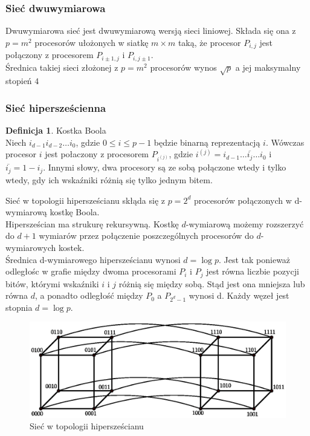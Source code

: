 \documentclass[a4paper,oneside,leqno,12pt]{book}
\theoremstyle{definition}
\newtheorem{definicja}{Definicja}[chapter]
\theoremstyle{plain}
\theoremstyle{remark}
\begin{document}
\subsubsection{Sieć dwuwymiarowa}

Dwuwymiarowa sieć jest dwuwymiarową wersją sieci liniowej. Składa się ona z \(p=m^2\) procesorów ułożonych w siatkę \(m\times m\) taką, że procesor \(P_{i,j}\) jest połączony z procesorem \(P_{i\pm 1, j}\) i \(P_{i, j\pm 1}\).\\
Średnica takiej sieci złożonej z \(p=m^2\) procesorów wynos \(\sqrt{p}\) a jej maksymalny stopień \(4\)


\subsubsection{Sieć hipersześcienna}

\begin{definicja}{Kostka Boola}\\
Niech \(i_{d-1}i_{d-2}\dots i_{0}\), gdzie \(0\leq i \leq p-1\) będzie binarną reprezentacją \(i\). Wówczas procesor \({i}\) jest połaczony z procesorem \(P_{i^(j)}\), gdzie \(i^{(j)}=i_{d-1}\dots \overline{i_j} \dots i_0\) i \(\overline{i_j} = 1 - i_j\). Innymi słowy, dwa procesory są ze sobą połączone wtedy i tylko wtedy, gdy ich wskaźniki różnią się tylko jednym bitem.\\
\end{definicja}

Sieć w topologii hipersześcianu skłąda się z \(p=2^d\) procesorów połączonych w d-wymiarową kostkę Boola.\\

Hipersześcian ma strukurę rekursywną. Kostkę \(d\)-wymiarową możemy rozszerzyć do \(d+1\) wymiarów przez połączenie poszczególnych procesorów do \(d\)-wymiarowych kostek.\\

Średnica d-wymiarowego hipersześcianu wynosi \(d=\log{p}\). Jest tak ponieważ odległośc w grafie między dwoma procesorami \(P_i\) i \(P_j\) jest równa liczbie pozycji bitów, którymi wskaźniki \(i\) i \(j\) różnią się między sobą. Stąd jest ona mniejsza lub równa \(d\), a ponadto odległość między \(P_0\) a \(P_{2^d-1}\) wynosi d. Każdy węzeł jest stopnia \(d=\log{p}\).

\begin{figure}[h]
\centering
\includegraphics[width=36em]{./images/systolic.eps}
\caption{Sieć w topologii hipersześcianu}
\label{fig:systolic}
\end{figure}
\end{document}
